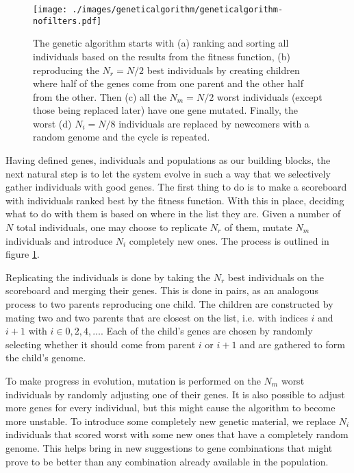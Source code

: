 \documentclass[aps,prb,twocolumn,floatfix]{revtex4}
\begin{document}
\begin{figure}
    \centering
    \texttt{[image: ./images/geneticalgorithm/geneticalgorithm-nofilters.pdf]}
    \caption{The genetic algorithm starts with (a) ranking and sorting all individuals based on the results from the fitness function, (b) reproducing the $N_r = N/2$ best individuals by creating children where half of the genes come from one parent and the other half from the other. Then (c) all the $N_m = N/2$ worst individuals (except those being replaced later) have one gene mutated. Finally, the worst (d) $N_i = N/8$ individuals are replaced by newcomers with a random genome and the cycle is repeated.}
    \label{fig:geneticalgorithm}
\end{figure}

Having defined genes, individuals and populations as our building blocks, the next natural step is to let the system evolve in such a way that we selectively gather individuals with good genes. The first thing to do is to make a scoreboard with individuals ranked best by the fitness function. With this in place, deciding what to do with them is based on where in the list they are. Given a number of $N$ total individuals, one may choose to replicate $N_r$ of them, mutate $N_m$ individuals and introduce $N_i$ completely new ones. The process is outlined in figure \ref{fig:geneticalgorithm}.

Replicating the individuals is done by taking the $N_r$ best individuals on the scoreboard and merging their genes. This is done in pairs, as an analogous process to two parents reproducing one child. The children are constructed by mating two and two parents that are closest on the list, i.e. with indices $i$ and $i+1$ with $i \in 0,2,4,\ldots$. Each of the child's genes are chosen by randomly selecting whether it should come from parent $i$ or $i+1$ and are gathered to form the child's genome.

To make progress in evolution, mutation is performed on the $N_m$ worst individuals by randomly adjusting one of their genes. It is also possible to adjust more genes for every individual, but this might cause the algorithm to become more unstable. To introduce some completely new genetic material, we replace $N_i$ individuals that scored worst with some new ones that have a completely random genome. This helps bring in new suggestions to gene combinations that might prove to be better than any combination already available in the population.
\end{document}
